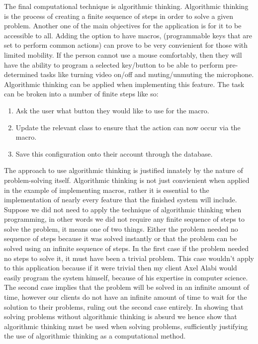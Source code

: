 The final computational technique is algorithmic thinking. 
Algorithmic thinking is the process of creating a finite 
sequence of steps in order to solve a given problem. Another 
one of the main objectives for the application is for it to be
accessible to all. Adding the option to have macros, 
(programmable keys that are set to perform common actions) 
can prove to be very convienient for those with limited
mobility. If the person cannot use a mouse comfortably, then 
they will have the ability to program a selected key/button to 
be able to perform pre-determined tasks like turning video
on/off and muting/unmuting the microphone. Algorithmic thinking
can be applied when implementing this feature. The task can 
be broken into a number of finite steps like so: \\

\begin{enumerate}
  \item Ask the user what button they would like to use for the macro.
  \item Update the relevant class to ensure that the action can now occur via the macro.
  \item Save this configuration onto their account through the database.
\end{enumerate}

The approach to use algorithmic thinking is justified innately
by the nature of problem-solving itself. Algorithmic thinking
is not just convienient when applied in the example of
implementing
macros, rather it is essential to the implementation of nearly
every feature that the finished system will include. Suppose 
we did not need to apply the technique of algorithmic
thinking when programming, in other words we did not require
any finite sequence of steps to solve the problem, it means 
one of two things. Either the problem needed no sequence of 
steps because it was solved instantly or that the problem
can be solved
using an infinite sequence of steps. In the first case if the
problem needed no steps to solve it, it must have been a
trivial problem. This case wouldn't apply to this application
because if it were trivial then my client Axel Alabi would 
easily program the system himself, because of his expertise in 
computer science. The second case implies that the problem will
be solved in an infinite amount of time, however our clients
do not have an infinite amount of time to wait for the 
solution to their problems, ruling out the second case 
entirely. In showing that solving problems without algorithmic
thinking is absurd we hence show that algorithmic thinking
must be used when solving problems, sufficiently justifying 
the use of algorithmic thinking as a computational method.

